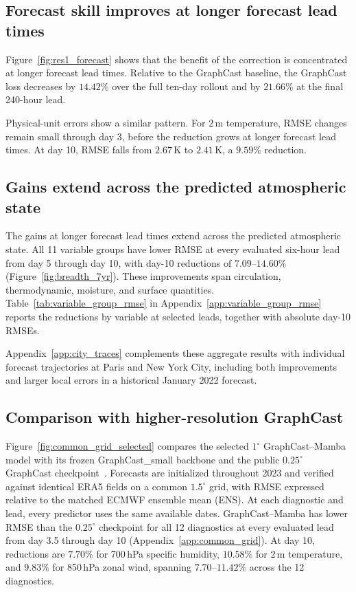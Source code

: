 \documentclass[11pt]{article}
\begin{document}
\subsection{Forecast skill improves at longer forecast lead times}

Figure~\ref{fig:res1_forecast} shows that the benefit of the correction is concentrated at longer forecast lead times. {Relative to the GraphCast baseline, the {GraphCast loss} decreases by $14.42\%$ over the full ten-day rollout and by $21.66\%$ at the final 240-hour lead.}

Physical-unit errors show a similar pattern. {For $2$\,m temperature, RMSE changes remain small through day 3, before the reduction grows at longer forecast lead times.} {At day 10, RMSE falls from $2.67$\,K to $2.41$\,K, a $9.59\%$ reduction.}


\subsection{Gains extend across the predicted atmospheric state}
The gains at longer forecast lead times extend across the predicted atmospheric state. {All 11 variable groups have lower RMSE at every evaluated six-hour lead from day 5 through day 10, with day-10 reductions of $7.09$--$14.60\%$ (Figure~\ref{fig:breadth_7yr}).} These improvements span circulation, thermodynamic, moisture, and surface quantities. Table~\ref{tab:variable_group_rmse} in Appendix~\ref{app:variable_group_rmse} reports the reductions by variable at selected leads, together with absolute day-10 RMSEs.



{Appendix~\ref{app:city_traces} complements these aggregate results with individual forecast trajectories at Paris and New York City, including both improvements and larger local errors in a historical January 2022 forecast.}

\subsection{\texorpdfstring{{Comparison with higher-resolution GraphCast}}{Comparison with higher-resolution GraphCast}}
\label{sec:common_grid}
Figure~\ref{fig:common_grid_selected} compares the selected $1^\circ$ GraphCast--Mamba model with its frozen GraphCast\_small backbone and the public $0.25^\circ$ GraphCast checkpoint~\citep{lam2023graphcast}. Forecasts are initialized throughout 2023 and verified against identical ERA5 fields on a common $1.5^\circ$ grid, with RMSE expressed relative to the matched ECMWF ensemble mean (ENS). At each diagnostic and lead, every predictor uses the same available dates. GraphCast--Mamba has lower RMSE than the $0.25^\circ$ checkpoint for all 12 diagnostics at every evaluated lead from day 3.5 through day 10 (Appendix~\ref{app:common_grid}). At day 10, reductions are $7.70\%$ for 700\,hPa specific humidity, $10.58\%$ for $2$\,m temperature, and $9.83\%$ for 850\,hPa zonal wind, spanning $7.70$--$11.42\%$ across the 12 diagnostics.
\end{document}
